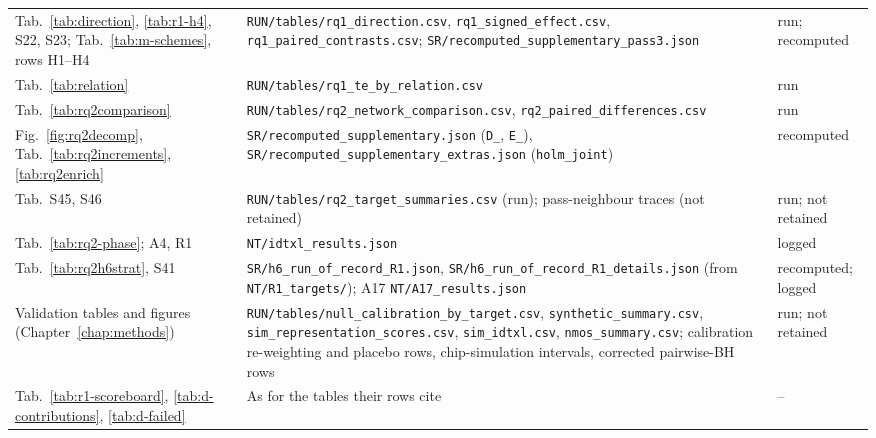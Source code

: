 \begin{longtable}{@{}L{0.25\textwidth}L{0.50\textwidth}L{0.19\textwidth}@{}}
Tab.~\ref{tab:direction}, \ref{tab:r1-h4}, S22, S23; Tab.~\ref{tab:m-schemes}, rows H1--H4 & \texttt{RUN/\allowbreak tables/\allowbreak rq1\_\allowbreak direction.csv}, \texttt{rq1\_\allowbreak signed\_\allowbreak effect.csv}, \texttt{rq1\_\allowbreak paired\_\allowbreak contrasts.csv}; \texttt{SR/\allowbreak recomputed\_\allowbreak supplementary\_\allowbreak pass3.json} & run; recomputed \\
Tab.~\ref{tab:relation} & \texttt{RUN/\allowbreak tables/\allowbreak rq1\_\allowbreak te\_\allowbreak by\_\allowbreak relation.csv} & run \\
Tab.~\ref{tab:rq2comparison} & \texttt{RUN/\allowbreak tables/\allowbreak rq2\_\allowbreak network\_\allowbreak comparison.csv}, \texttt{rq2\_\allowbreak paired\_\allowbreak differences.csv} & run \\
Fig.~\ref{fig:rq2decomp}, Tab.~\ref{tab:rq2increments}, \ref{tab:rq2enrich} & \texttt{SR/\allowbreak recomputed\_\allowbreak supplementary.json} (\texttt{D\_\allowbreak *}, \texttt{E\_\allowbreak *}), \texttt{SR/\allowbreak recomputed\_\allowbreak supplementary\_\allowbreak extras.json} (\texttt{holm\_\allowbreak joint}) & recomputed \\
Tab.~S45, S46 & \texttt{RUN/\allowbreak tables/\allowbreak rq2\_\allowbreak target\_\allowbreak summaries.csv} (run); pass-neighbour traces (not retained) & run; not retained \\
Tab.~\ref{tab:rq2-phase}; A4, R1 & \texttt{NT/\allowbreak idtxl\_\allowbreak results.json} & logged \\
Tab.~\ref{tab:rq2h6strat}, S41 & \texttt{SR/\allowbreak h6\_\allowbreak run\_\allowbreak of\_\allowbreak record\_\allowbreak R1.json}, \texttt{SR/\allowbreak h6\_\allowbreak run\_\allowbreak of\_\allowbreak record\_\allowbreak R1\_\allowbreak details.json} (from \texttt{NT/\allowbreak R1\_\allowbreak targets/\allowbreak }); A17 \texttt{NT/\allowbreak A17\_\allowbreak results.json} & recomputed; logged \\
Validation tables and figures (Chapter~\ref{chap:methods}) & \texttt{RUN/\allowbreak tables/\allowbreak null\_\allowbreak calibration\_\allowbreak by\_\allowbreak target.csv}, \texttt{synthetic\_\allowbreak summary.csv}, \texttt{sim\_\allowbreak representation\_\allowbreak scores.csv}, \texttt{sim\_\allowbreak idtxl.csv}, \texttt{nmos\_\allowbreak summary.csv}; calibration re-weighting and placebo rows, chip-simulation intervals, corrected pairwise-BH rows & run; not retained \\
Tab.~\ref{tab:r1-scoreboard}, \ref{tab:d-contributions}, \ref{tab:d-failed} & As for the tables their rows cite & -- \\
\bottomrule
\end{longtable}

